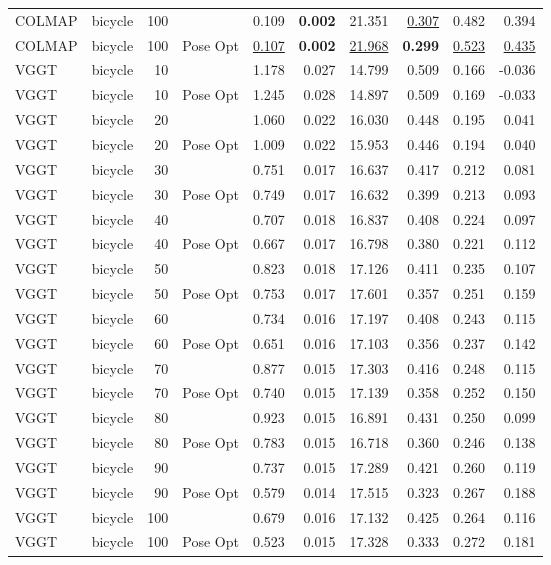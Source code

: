 \begin{table}[H]
\begin{tabular}{llrlrrrrrr}
COLMAP & bicycle & 100 &  & 0.109 & \textbf{0.002} & 21.351 & \underline{0.307} & 0.482 & 0.394 \\
COLMAP & bicycle & 100 & Pose Opt & \underline{0.107} & \textbf{0.002} & \underline{21.968} & \textbf{0.299} & \underline{0.523} & \underline{0.435} \\
VGGT & bicycle & 10 &  & 1.178 & 0.027 & 14.799 & 0.509 & 0.166 & -0.036 \\
VGGT & bicycle & 10 & Pose Opt & 1.245 & 0.028 & 14.897 & 0.509 & 0.169 & -0.033 \\
VGGT & bicycle & 20 &  & 1.060 & 0.022 & 16.030 & 0.448 & 0.195 & 0.041 \\
VGGT & bicycle & 20 & Pose Opt & 1.009 & 0.022 & 15.953 & 0.446 & 0.194 & 0.040 \\
VGGT & bicycle & 30 &  & 0.751 & 0.017 & 16.637 & 0.417 & 0.212 & 0.081 \\
VGGT & bicycle & 30 & Pose Opt & 0.749 & 0.017 & 16.632 & 0.399 & 0.213 & 0.093 \\
VGGT & bicycle & 40 &  & 0.707 & 0.018 & 16.837 & 0.408 & 0.224 & 0.097 \\
VGGT & bicycle & 40 & Pose Opt & 0.667 & 0.017 & 16.798 & 0.380 & 0.221 & 0.112 \\
VGGT & bicycle & 50 &  & 0.823 & 0.018 & 17.126 & 0.411 & 0.235 & 0.107 \\
VGGT & bicycle & 50 & Pose Opt & 0.753 & 0.017 & 17.601 & 0.357 & 0.251 & 0.159 \\
VGGT & bicycle & 60 &  & 0.734 & 0.016 & 17.197 & 0.408 & 0.243 & 0.115 \\
VGGT & bicycle & 60 & Pose Opt & 0.651 & 0.016 & 17.103 & 0.356 & 0.237 & 0.142 \\
VGGT & bicycle & 70 &  & 0.877 & 0.015 & 17.303 & 0.416 & 0.248 & 0.115 \\
VGGT & bicycle & 70 & Pose Opt & 0.740 & 0.015 & 17.139 & 0.358 & 0.252 & 0.150 \\
VGGT & bicycle & 80 &  & 0.923 & 0.015 & 16.891 & 0.431 & 0.250 & 0.099 \\
VGGT & bicycle & 80 & Pose Opt & 0.783 & 0.015 & 16.718 & 0.360 & 0.246 & 0.138 \\
VGGT & bicycle & 90 &  & 0.737 & 0.015 & 17.289 & 0.421 & 0.260 & 0.119 \\
VGGT & bicycle & 90 & Pose Opt & 0.579 & 0.014 & 17.515 & 0.323 & 0.267 & 0.188 \\
VGGT & bicycle & 100 &  & 0.679 & 0.016 & 17.132 & 0.425 & 0.264 & 0.116 \\
VGGT & bicycle & 100 & Pose Opt & 0.523 & 0.015 & 17.328 & 0.333 & 0.272 & 0.181 \\

\end{tabular}
\end{table}
